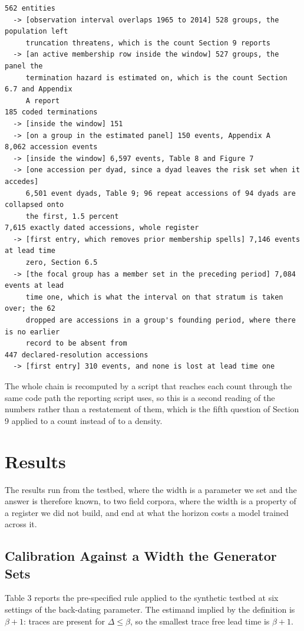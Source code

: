 \documentclass[twoside,11pt]{article}
\begin{document}
{\small
\begin{verbatim}
562 entities
  -> [observation interval overlaps 1965 to 2014] 528 groups, the population left
     truncation threatens, which is the count Section 9 reports
  -> [an active membership row inside the window] 527 groups, the panel the
     termination hazard is estimated on, which is the count Section 6.7 and Appendix
     A report
185 coded terminations
  -> [inside the window] 151
  -> [on a group in the estimated panel] 150 events, Appendix A
8,062 accession events
  -> [inside the window] 6,597 events, Table 8 and Figure 7
  -> [one accession per dyad, since a dyad leaves the risk set when it accedes]
     6,501 event dyads, Table 9; 96 repeat accessions of 94 dyads are collapsed onto
     the first, 1.5 percent
7,615 exactly dated accessions, whole register
  -> [first entry, which removes prior membership spells] 7,146 events at lead time
     zero, Section 6.5
  -> [the focal group has a member set in the preceding period] 7,084 events at lead
     time one, which is what the interval on that stratum is taken over; the 62
     dropped are accessions in a group's founding period, where there is no earlier
     record to be absent from
447 declared-resolution accessions
  -> [first entry] 310 events, and none is lost at lead time one
\end{verbatim}
}

The whole chain is recomputed by a script that reaches each count through the same code path the reporting script uses, so this is a second reading of the numbers rather than a restatement of them, which is the fifth question of Section 9 applied to a count instead of to a density.

\section{Results}

The results run from the testbed, where the width is a parameter we set and the answer is therefore known, to two field corpora, where the width is a property of a register we did not build, and end at what the horizon costs a model trained across it.

\subsection{Calibration Against a Width the Generator Sets}

Table 3 reports the pre-specified rule applied to the synthetic testbed at six settings of the back-dating parameter. The estimand implied by the definition is \(\beta + 1\): traces are present for \(\Delta \leq \beta\), so the smallest trace free lead time is \(\beta + 1\).
\end{document}
